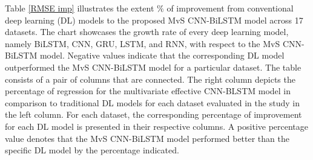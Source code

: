 \documentclass[a4paper,fleqn]{cas-dc}
\begin{document}
    Table \ref{RMSE imp} illustrates the extent $\%$ of improvement from conventional deep learning (DL) models to the proposed MvS CNN-BiLSTM model across 17 datasets. The chart showcases the growth rate of every deep learning model, namely BiLSTM, CNN, GRU, LSTM, and RNN, with respect to the MvS CNN-BiLSTM model. Negative values indicate that the corresponding DL model outperformed the MvS CNN-BiLSTM model for a particular dataset. The table consists of a pair of columns that are connected. The right column depicts the percentage of regression for the multivariate effective CNN-BLSTM model in comparison to traditional DL models for each dataset evaluated in the study in the left column. For each dataset, the corresponding percentage of improvement for each DL model is presented in their respective columns. A positive percentage value denotes that the MvS CNN-BiLSTM model performed better than the specific DL model by the percentage indicated.

\end{document}
